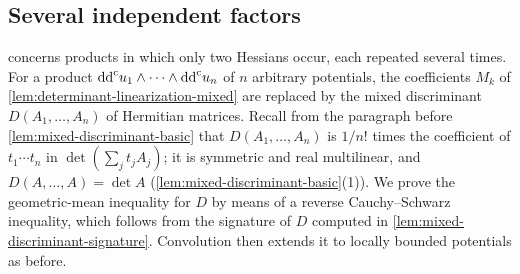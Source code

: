 \subsection{Several independent factors}
\label{sec:bt-multifactor-density}
 concerns products in which only two Hessians occur, each repeated several times. For a product $\mathrm{dd}^{\mathrm{c}} u_1\wedge\cdots\wedge\mathrm{dd}^{\mathrm{c}} u_n$ of $n$ arbitrary potentials, the coefficients $M_k$ of \cref{lem:determinant-linearization-mixed} are replaced by the mixed discriminant $D(A_1,\ldots,A_n)$ of Hermitian matrices. Recall from the paragraph before \cref{lem:mixed-discriminant-basic} that $D(A_1,\ldots,A_n)$ is $1/n!$ times the coefficient of $t_1\cdots t_n$ in $\det(\sum_jt_jA_j)$; it is symmetric and real multilinear, and $D(A,\ldots,A)=\det A$ (\cref{lem:mixed-discriminant-basic}(1)). We prove the geometric-mean inequality for $D$ by means of a reverse Cauchy--Schwarz inequality, which follows from the signature of $D$ computed in \cref{lem:mixed-discriminant-signature}. Convolution then extends it to locally bounded potentials as before.

